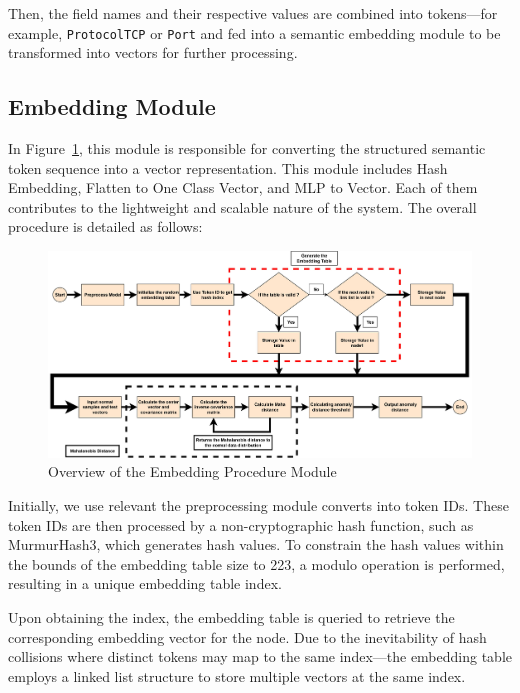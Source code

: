 \begin{ZhChapter}
    Then, the field names and their respective values are combined into tokens—for example, \texttt{Protocol\:TCP} or \texttt{Port} and fed into a semantic embedding module to be transformed into vectors for further processing.




    \subsection{Embedding Module}
    In Figure~\ref{fig:HashEmbeddingDetail}, this module is responsible for converting the structured semantic token sequence into a vector representation. This module includes Hash Embedding, Flatten to One Class Vector, and MLP to Vector. Each of them contributes to the lightweight and scalable nature of the system. The overall procedure is detailed as follows:

    \begin{figure}[htbp]
        \centering
        \includegraphics[width = 1\textwidth]{image/embedding.jpg}
        \caption{Overview of the Embedding Procedure Module}
        \label{fig:HashEmbeddingDetail}
    \end{figure}

    Initially, we use relevant the preprocessing module converts into token IDs. These token IDs are then processed by a non-cryptographic hash function, such as MurmurHash3, which generates hash values. To constrain the hash values within the bounds of the embedding table size to 223, a modulo operation is performed, resulting in a unique embedding table index.

    Upon obtaining the index, the embedding table is queried to retrieve the corresponding embedding vector for the node. Due to the inevitability of hash collisions where distinct tokens may map to the same index—the embedding table employs a linked list structure to store multiple vectors at the same index.






\end{ZhChapter}
